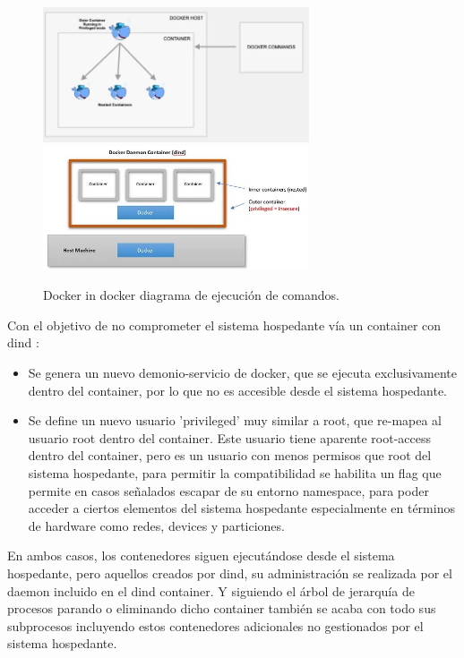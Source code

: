 \begin{figure}[!htb]
\begin{center}
\includegraphics[width=0.7\textwidth]{./figuras/dind.jpg}
\includegraphics[width=0.7\textwidth]{./figuras/dind_command.jpg}
\caption{Docker in docker diagrama de ejecución de comandos\cite{i_dind_dood}.}
\label{F:dind}
\end{center}
\end{figure}
Con el objetivo de no comprometer el sistema hospedante vía un container con dind :
\begin{itemize}
    \item Se genera un nuevo demonio-servicio de docker, que se ejecuta exclusivamente dentro del container, por lo que no es accesible desde el sistema hospedante.
    \item Se define un nuevo usuario 'privileged' muy similar a root, que re-mapea al usuario root dentro del container. Este usuario tiene aparente root-access dentro del container, pero es un usuario con menos permisos que root del sistema hospedante, para permitir la compatibilidad se habilita un flag que permite en casos señalados escapar de su entorno namespace, para poder acceder a ciertos elementos del sistema hospedante especialmente en términos de hardware como redes, devices y particiones.
\end{itemize}
En ambos casos, los contenedores siguen ejecutándose desde el sistema hospedante, pero aquellos creados por dind, su administración se realizada por el daemon incluido en el dind container. Y siguiendo el árbol de jerarquía de procesos parando o eliminando dicho container también se acaba con todo sus subprocesos incluyendo estos contenedores adicionales no gestionados por el sistema hospedante.

